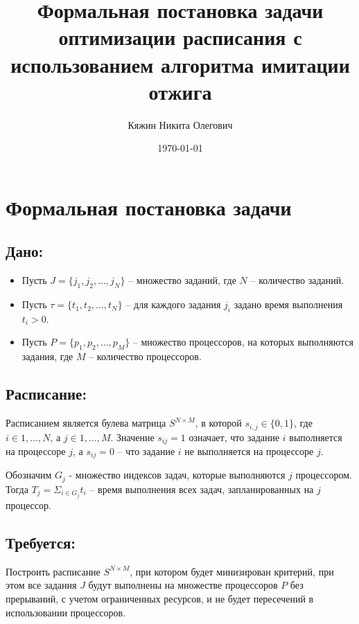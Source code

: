 \documentclass{article}
\begin{document}
    \title{\textbf{Формальная постановка задачи оптимизации расписания с использованием алгоритма имитации отжига}}
    \author{Кяжин Никита Олегович}
    \date{\today}
    \maketitle

    \newpage
    \pagestyle{fancy}
    \fancyhf{}
    \rhead{\thepage}

    \section*{Формальная постановка задачи}
        
        \subsection*{Дано:}
            \begin{itemize}
                \item Пусть $J = \{j_1, j_2, \dots, j_N\}$ -- множество заданий, где $N$ -- количество заданий.
                \item Пусть $\tau  = \{t_1, t_2, \dots, t_N\}$ -- для каждого задания $j_i$ задано время выполнения $t_i > 0$.
                \item Пусть $P = \{p_1, p_2, \dots, p_M\}$ -- множество процессоров, на которых выполняются задания, где $M$ -- количество процессоров.
            \end{itemize}
        
        \subsection*{Расписание:}
            Расписанием является булева матрица $S^{N \times M}$, в которой $s_{i,j} \in \{0, 1\}$, где $i \in {1, \dots, N}$, а $j \in {1, \dots, M}$. Значение $s_{ij} = 1$ означает,
            что задание $i$ выполняется на процессоре $j$, а $s_{ij} = 0$ -- что задание $i$ не выполняется на процессоре $j$.
            
            Обозначим $G_j$ - множество индексов задач, которые выполняются $j$ процессором. Тогда 
            $T_j = \Sigma_{i \in G_j}t_i$ -- время выполнения всех задач, запланированных на $j$ процессор.

        \subsection*{Требуется:}
            Построить расписание $S^{N \times M}$, при котором будет минизирован критерий, при этом все задания $J$ будут выполнены на множестве процессоров $P$ без прерываний,
            с учетом ограниченных ресурсов, и не будет пересечений в использовании процессоров.
\end{document}
